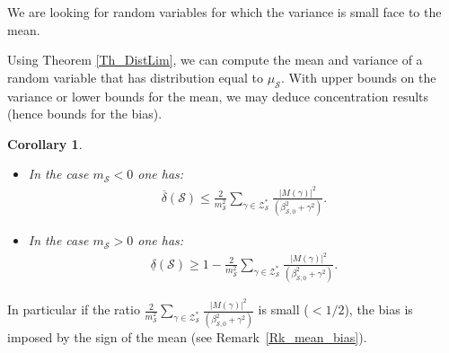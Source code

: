\documentclass[a4paper,10pt]{amsart}
\theoremstyle{plain}
\newtheorem{cor}[theo]{Corollary}
\theoremstyle{definition}
\begin{document}
We are looking for random variables for which the variance is small face to the mean.

Using Theorem \ref{Th_DistLim}, we can compute the mean and variance of a random variable that has distribution equal to $\mu_{\mathcal{S}}$.
With upper bounds on the variance or lower bounds for the mean, 
we may deduce concentration results (hence bounds for the bias).

\begin{cor}\label{Cor_ChebyshevIneq}
	\begin{itemize}
		\item In the case $m_{\mathcal{S}}<0$ one has:
		\begin{align*}
		\overline{\delta}(\mathcal{S}) \leq \frac{2}{m_{\mathcal{S}}^{2}}\sum_{\gamma \in \mathcal{Z}_{\mathcal{S}}^{*}}\frac{\lvert M(\gamma)\rvert^{2}}{(\beta_{\mathcal{S},0}^{2}+\gamma^{2})}.
		\end{align*}
		\item In the case $m_{\mathcal{S}}>0$ one has:
		\begin{align*}
		\underline{\delta}(\mathcal{S}) \geq 1- \frac{2}{m_{\mathcal{S}}^{2}}\sum_{\gamma \in \mathcal{Z}_{\mathcal{S}}^{*}}\frac{\lvert M(\gamma)\rvert^{2}}{(\beta_{\mathcal{S},0}^{2}+\gamma^{2})}.
		\end{align*}
	\end{itemize}
\end{cor}

In particular if the ratio $\frac{2}{m_{\mathcal{S}}^{2}}\sum_{\gamma \in \mathcal{Z}_{\mathcal{S}}^{*}}\frac{\lvert M(\gamma)\rvert^{2}}{(\beta_{\mathcal{S},0}^{2}+\gamma^{2})}$ is small ($< 1/2$),
the bias is imposed by the sign of the mean (see Remark~\ref{Rk_mean_bias}).
\end{document}
